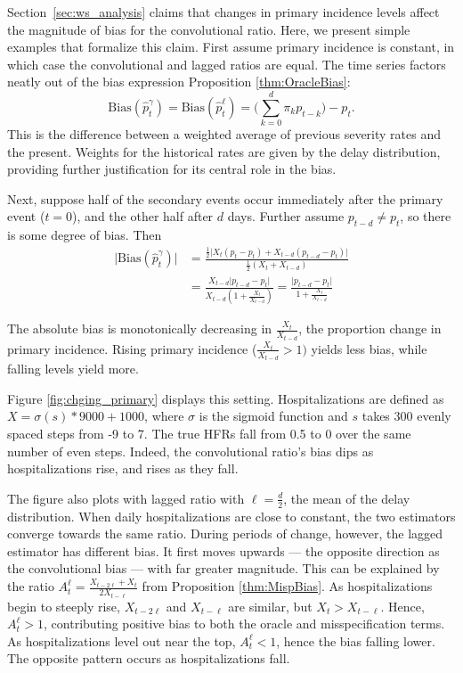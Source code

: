 \documentclass{article}
\renewcommand{\hat}{\widehat} %
\begin{document}
Section~\ref{sec:ws_analysis} claims that changes in primary incidence levels affect the magnitude of bias for the convolutional ratio. Here, we present simple examples that formalize this claim. First assume primary incidence is constant, in which case the convolutional and lagged ratios are equal. The time series factors neatly out of the bias expression  Proposition \ref{thm:OracleBias}:
$$\text{Bias}(\hat{p}_t^{\gamma}) = \text{Bias}(\hat{p}_t^\ell) = \Big(\sum_{k=0}^d \pi_k p_{t-k}\Big)-p_t.$$
\noindent This is the difference between a weighted average of previous severity rates and the present. Weights for the historical rates are given by the delay distribution, providing further justification for its central role in the bias. 

Next, suppose half of the secondary events occur immediately after the primary event ($t=0$), and the other half after $d$ days. Further assume $p_{t-d}\neq p_t$, so there is some degree of bias. Then
\begin{align*}
    \lvert\text{Bias}(\hat{p}_t^{\gamma})\rvert &= \frac{\frac{1}{2}\big\lvert X_{t}(p_t-p_t) + X_{t-d}(p_{t-d}-p_t)\big\rvert}{\frac{1}{2}(X_{t}+X_{t-d})} \\
    &=\frac{X_{t-d}\lvert p_{t-d}-p_t\rvert}{X_{t-d}(1+\frac{X_{t}}{X_{t-d}})} = \frac{\lvert p_{t-d}-p_t \rvert}{1+\frac{X_{t}}{X_{t-d}}}
\end{align*}

The absolute bias is monotonically decreasing in $\frac{X_{t}}{X_{t-d}}$, the proportion change in primary incidence. Rising primary incidence ($\frac{X_{t}}{X_{t-d}}>1)$ yields less bias, while falling levels yield more.

Figure \ref{fig:chging_primary} displays this setting. Hospitalizations are defined as $X = \sigma(s)*9000+1000$, where $\sigma$ is the sigmoid function and $s$ takes 300 evenly spaced steps from -9 to 7. The true HFRs fall from 0.5 to 0 over the same number of even steps. Indeed, the convolutional ratio's bias dips as hospitalizations rise, and rises as they fall. 

The figure also plots with lagged ratio with $\ell=\frac{d}{2}$, the mean of the delay distribution. When daily hospitalizations are close to constant, the two estimators converge towards the same ratio. During periods of change, however, the lagged estimator has different bias. It first moves upwards --- the opposite direction as the convolutional bias --- with far greater magnitude. This can be explained by the ratio $A_t^\ell = \frac{X_{t-2\ell}+X_t}{2X_{t-\ell}}$ from Proposition \ref{thm:MispBias}. As hospitalizations begin to steeply rise, $X_{t-2\ell}$ and $X_{t-\ell}$ are similar, but $X_t > X_{t-\ell}$. Hence, $A_t^\ell>1$, contributing positive bias to both the oracle and misspecification terms. As hospitalizations level out near the top, $A_t^\ell < 1$, hence the bias falling lower. The opposite pattern occurs as hospitalizations fall. 
\end{document}
